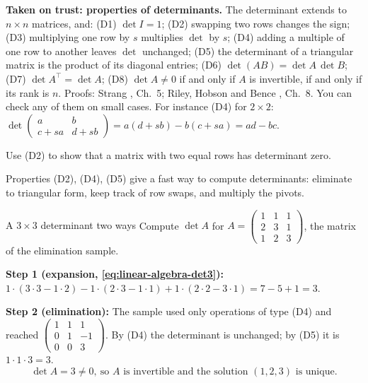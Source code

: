 \begin{beyond}
\textbf{Taken on trust: properties of determinants.} The determinant extends to $n\times n$ matrices, and:
(D1) $\det I=1$;
(D2) swapping two rows changes the sign;
(D3) multiplying one row by $s$ multiplies $\det$ by $s$;
(D4) adding a multiple of one row to another leaves $\det$ unchanged;
(D5) the determinant of a triangular matrix is the product of its diagonal entries;
(D6) $\det(AB)=\det A\,\det B$;
(D7) $\det A^\top=\det A$;
(D8) $\det A\neq0$ if and only if $A$ is invertible, if and only if its rank is $n$.
Proofs: Strang \cite{strang}, Ch.~5; Riley, Hobson and Bence \cite{rhb}, Ch.~8. You can check any of them on small cases. For instance (D4) for $2\times2$: $\det\begin{pmatrix}a&b\\c+sa&d+sb\end{pmatrix}=a(d+sb)-b(c+sa)=ad-bc$.
\end{beyond}

\begin{checkpoint}
Use (D2) to show that a matrix with two equal rows has determinant zero.
\end{checkpoint}

Properties (D2), (D4), (D5) give a fast way to compute determinants: eliminate to triangular form, keep track of row swaps, and multiply the pivots.

\begin{sample}{A $3\times3$ determinant two ways}
Compute $\det A$ for $A=\begin{pmatrix}1&1&1\\2&3&1\\1&2&3\end{pmatrix}$, the matrix of the elimination sample.

\textbf{Step 1 (expansion, \cref{eq:linear-algebra-det3}):} $1\cdot(3\cdot3-1\cdot2)-1\cdot(2\cdot3-1\cdot1)+1\cdot(2\cdot2-3\cdot1)=7-5+1=3$.

\textbf{Step 2 (elimination):} The sample used only operations of type (D4) and reached $\begin{pmatrix}1&1&1\\0&1&-1\\0&0&3\end{pmatrix}$. By (D4) the determinant is unchanged; by (D5) it is $1\cdot1\cdot3=3$.
\[
\boxed{\det A=3\neq0,\ \text{so } A \text{ is invertible and the solution } (1,2,3) \text{ is unique.}}
\]
\end{sample}

